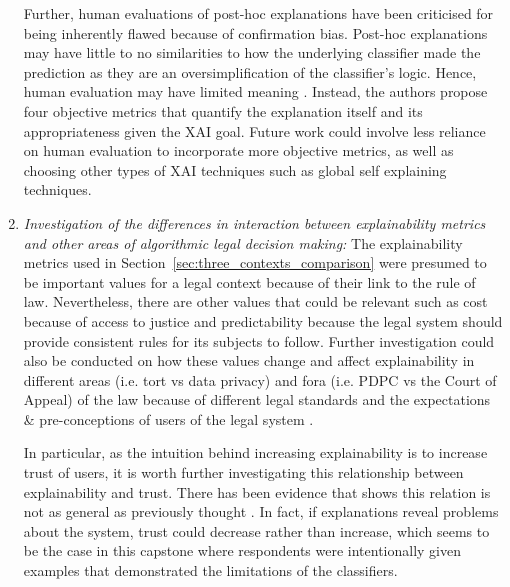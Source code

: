 \begin{enumerate}
    Further, human evaluations of post-hoc explanations have been criticised for being inherently flawed because of confirmation bias. Post-hoc explanations may have little to no similarities to how the underlying classifier made the prediction as they are an oversimplification of the classifier's logic. Hence, human evaluation may have limited meaning \cite{rosenfeld2021}. Instead, the authors propose four objective metrics that quantify the explanation itself and its appropriateness given the XAI goal. Future work could involve less reliance on human evaluation to incorporate more objective metrics, as well as choosing other types of XAI techniques such as global self explaining techniques. 

    \item \textit{Investigation of the differences in interaction between explainability metrics and other areas of algorithmic legal decision making:} The explainability metrics used in Section~\ref{sec:three_contexts_comparison} were presumed to be important values for a legal context because of their link to the rule of law. Nevertheless, there are other values that could be relevant such as cost because of access to justice and predictability because the legal system should provide consistent rules for its subjects to follow. Further investigation could also be conducted on how these values change and affect explainability in different areas (i.e. tort vs data privacy) and fora (i.e. PDPC vs the Court of Appeal) of the law because of different legal standards \cite{hacker2022varieties} and the expectations \& pre-conceptions of users of the legal system \cite{yalcin2022perceptions}.
    
    In particular, as the intuition behind increasing explainability is to increase trust of users, it is worth further investigating this relationship between explainability and trust. There has been evidence that shows this relation is not as general as previously thought \cite{kastner2021}. In fact, if explanations reveal problems about the system, trust could decrease rather than increase, which seems to be the case in this capstone where respondents were intentionally given examples that demonstrated the limitations of the classifiers.
\end{enumerate}

